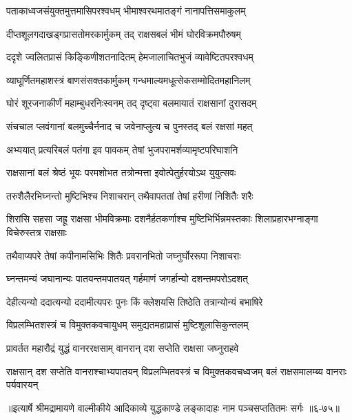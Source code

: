 \twolineshloka
{पताकाध्वजसंयुक्तमुत्तमासिपरश्वधम्}
{भीमाश्वरथमातङ्गं नानापत्तिसमाकुलम्} %

\twolineshloka
{दीप्तशूलगदाखड्गप्रासतोमरकार्मुकम्}
{तद् राक्षसबलं भीमं घोरविक्रमपौरुषम्} %

\twolineshloka
{ददृशे ज्वलितप्रासं किङ्किणीशतनादितम्}
{हेमजालाचितभुजं व्यावेष्टितपरश्वधम्} %

\twolineshloka
{व्याघूर्णितमहाशस्त्रं बाणसंसक्तकार्मुकम्}
{गन्धमाल्यमधूत्सेकसम्मोदितमहानिलम्} %

\twolineshloka
{घोरं शूरजनाकीर्णं महाम्बुधरनिःस्वनम्}
{तद् दृष्ट्वा बलमायातं राक्षसानां दुरासदम्} %

\twolineshloka
{संचचाल प्लवंगानां बलमुच्चैर्ननाद च}
{जवेनाप्लुत्य च पुनस्तद् बलं रक्षसां महत्} %

\twolineshloka
{अभ्ययात् प्रत्यरिबलं पतंगा इव पावकम्}
{तेषां भुजपरामर्शव्यामृष्टपरिघाशनि} %

\twolineshloka
{राक्षसानां बलं श्रेष्ठं भूयः परमशोभत}
{तत्रोन्मत्ता इवोत्पेतुर्हरयोऽथ युयुत्सवः} %

\twolineshloka
{तरुशैलैरभिघ्नन्तो मुष्टिभिश्च निशाचरान्}
{तथैवापततां तेषां हरीणां निशितैः शरैः} %

\threelineshloka
{शिरांसि सहसा जह्रू राक्षसा भीमविक्रमाः}
{दशनैर्हतकर्णाश्च मुष्टिभिर्भिन्नमस्तकाः}
{शिलाप्रहारभग्नाङ्गा विचेरुस्तत्र राक्षसाः} %

\twolineshloka
{तथैवाप्यपरे तेषां कपीनामसिभिः शितैः}
{प्रवरानभितो जघ्नुर्घोररूपा निशाचराः} %

\twolineshloka
{घ्नन्तमन्यं जघानान्यः पातयन्तमपातयत्}
{गर्हमाणं जगर्हान्यो दशन्तमपरोऽदशत्} %

\twolineshloka
{देहीत्यन्यो ददात्यन्यो ददामीत्यपरः पुनः}
{किं क्लेशयसि तिष्ठेति तत्रान्योन्यं बभाषिरे} %

\twolineshloka
{विप्रलम्भितशस्त्रं च विमुक्तकवचायुधम्}
{समुद्यतमहाप्रासं मुष्टिशूलासिकुन्तलम्} %

\twolineshloka
{प्रावर्तत महारौद्रं युद्धं वानररक्षसाम्}
{वानरान् दश सप्तेति राक्षसा जघ्नुराहवे} %

\threelineshloka
{राक्षसान् दश सप्तेति वानराश्चाभ्यपातयन्}
{विप्रलम्भितवस्त्रं च विमुक्तकवचध्वजम्}
{बलं राक्षसमालम्ब्य वानराः पर्यवारयन्} %


॥इत्यार्षे श्रीमद्रामायणे वाल्मीकीये आदिकाव्ये युद्धकाण्डे लङ्कादाहः नाम पञ्चसप्ततितमः सर्गः ॥६-७५॥
